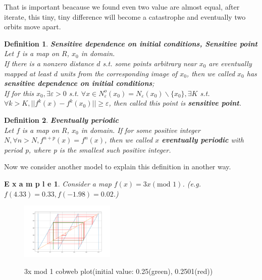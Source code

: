 \documentclass[12pt]{article}
\theoremstyle{plain}
\newtheorem{definition}{\textbf{Definition}}[section]
\newtheorem{example}{\textbf{E x a m p l e}}[section]
\begin{document}
That is important beacause we found even two value are almost equal, after iterate, this tiny, tiny difference will become a catastrophe and eventually two orbits move apart.

\begin{definition}\textbf{Sensitive dependence on initial conditions, Sensitive point}
\\\noindent Let $f$ is a map on $R$, $x_0$ in domain.
\\\noindent If there is a nonzero distance $d$ s.t. some points arbitrary near $x_0$ are eventually mapped at least $d$ units from the corresponding image of $x_0$, then we called $x_0$ has \textbf{sensitive dependence on initial conditions};
\\\noindent If for this $x_0, \exists \varepsilon > 0$ s.t. $\forall x \in N_\varepsilon^o(x_0) = N_\varepsilon(x_0) \backslash \{x_0\}, \exists K$ s.t. $\forall k > K, ||f^k(x) - f^k(x_0)|| \geq \varepsilon$, then called this point is \textbf{sensitive point}.
\end{definition}
\begin{definition}\textbf{Eventually periodic}
\\\noindent Let $f$ is a map on $R$, $x_0$ in domain. If for some positive integer $N, \forall n > N, f^{n+p}(x) = f^n(x)$, then we called $x$ \textbf{eventually periodic} with period p, where p is the smallest such positive integer.
\end{definition}

Now we consider another model to explain this definition in another way.

\begin{example}Consider a map $f(x) = 3x (\text{mod } 1)$. (e.g. $f(4.33) = 0.33, f(-1.98) = 0.02$.)
\end{example}

\begin{figure}[H]
\begin{center}
\includegraphics[width=0.4\textwidth]{figure/section1/3xmod1.png} \\
\caption{3x mod 1 cobweb plot(initial value: {\color{green}0.25(green)}, {\color{red}0.2501(red)})}\label{3xmod1}
\end{center}
\end{figure}
\end{document}
